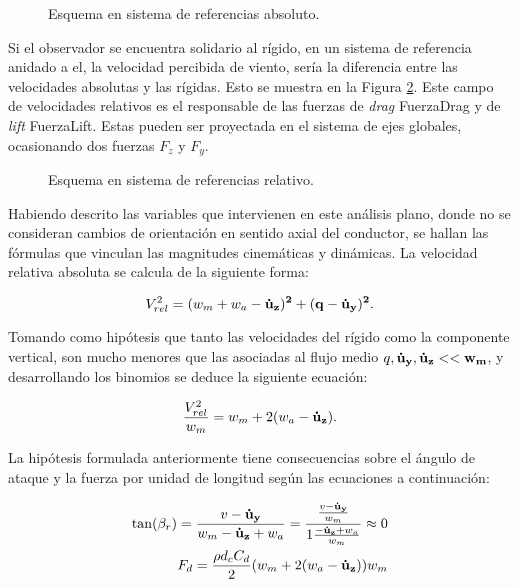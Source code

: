 \begin{figure}[htbp]
	\centering
	\def\svgwidth{60mm}
	
	\caption{Esquema en sistema de referencias absoluto.}
	\label{fig:MET:Viento:VelAbs}
\end{figure}

Si el observador se encuentra solidario al rígido, en un sistema de referencia anidado a el, la velocidad percibida de viento, sería la diferencia entre las velocidades absolutas y las rígidas. Esto se muestra en la Figura \ref{fig:MET:Viento:VelRel}. Este campo de velocidades relativos es el responsable de las fuerzas de \textit{drag} \gls{FuerzaDrag} y  de \textit{lift} \gls{FuerzaLift}. Estas pueden ser proyectada en el sistema de ejes globales, ocasionando dos fuerzas $F_z$ y $F_y$.


\begin{figure}[htbp]
	\centering
	\def\svgwidth{80mm}
	
	\caption{Esquema en sistema de referencias relativo.}
	\label{fig:MET:Viento:VelRel}
\end{figure}

Habiendo descrito las variables que intervienen en este análisis plano, donde no se consideran cambios de orientación en sentido axial del conductor, se hallan las fórmulas que vinculan las magnitudes cinemáticas y dinámicas. La velocidad relativa absoluta se calcula de la siguiente forma:

\begin{equation}
	\label{Eq:MET:VrelTot}
	V_{rel}^2=(w_m+w_a-\bf{\dot{u}}_{z})^2+(q-\bf{\dot{u}}_{y})^2.
\end{equation}

Tomando como hipótesis que tanto las velocidades del rígido como la componente vertical, son mucho menores que las asociadas al flujo medio $q,\bf{\dot{u}}_{y},\bf{\dot{u}_{z}}<<w_m$, y desarrollando los binomios se deduce la siguiente ecuación:

\begin{equation}
	\label{Eq:MET:VerlTotRatio}
	\frac{V_{rel}^2}{w_m}=w_m + 2 (w_a-\bf{\dot{u}}_{z}).
\end{equation}

La hipótesis formulada anteriormente tiene consecuencias sobre el ángulo de ataque y la fuerza por unidad de longitud según las ecuaciones a continuación:

\begin{eqnarray}
	\label{Eq:MET:AngleBeta}
	\tan (\beta_r) = \frac{v-\bf{\dot{u}}_{y}}{w_m - \bf{\dot{u}}_{z} + \text{$w_a$}}=\frac{\frac{v-\bf{\dot{u}}_{y}}{w_m}}{1 \frac{- \bf{\dot{u}}_{z} +\text{$w_a$}}{w_m}}\approx 0 \\
	\label{Eq:MET:DragPerLength}
	F_d = \frac{\rho d_c C_d}{2} (w_m + 2 (w_a-\bf{\dot{u}}_{z}))\text{$w_m$}
\end{eqnarray}

